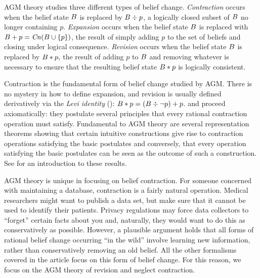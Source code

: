 AGM theory studies three different types of belief change. {\em Contraction}
occurs when the belief state $B$ is replaced by $B \div p$, a logically
closed subset of $B$ no longer containing $p$. {\em Expansion} occurs when
the belief state $B$ is replaced with $B+p = \text{\textit{Cn}}(B \cup \{p\})$, the
result of simply adding $p$ to the set of beliefs and closing under logical
consequence. {\em Revision} occurs when the belief state $B$ is replaced by
$B*p,$ the result of adding $p$ to $B$ and removing whatever is
necessary to ensure that the resulting belief state $B*p$ is logically
consistent.

Contraction is the fundamental form of belief change studied by AGM. There is no
mystery in how to define expansion, and revision is usually defined derivatively
via the {\em Levi identity} (): $B*p =
(B \div \neg p) + p$. \citet{alchourron1985logic} and \citet{
gardenfors1988revisions} proceed axiomatically: they postulate several
principles that every rational contraction operation must satisfy.  Fundamental
to AGM theory are several representation theorems showing that certain intuitive
constructions give rise to contraction operations satisfying the basic
postulates and conversely, that every operation satisfying the basic postulates
can be seen as the outcome of such a construction. See \citet{lin2019belief} for
an introduction to these results.  

AGM theory is unique in focusing on belief contraction. For someone concerned
with maintaining a database, contraction is a fairly natural operation. Medical
researchers might want to publish a data set, but make sure that it cannot be
used to identify their patients. Privacy regulations may force data collectors
to ``forget'' certain facts about you and, naturally, they would want to do this
as conservatively as possible.  However, a plausible argument holds that all
forms of rational belief change occurring ``in the wild'' involve learning new
information, rather than conservatively removing an old belief. All the other
formalisms covered in the article focus on this form of belief change. For this
reason, we focus on the AGM theory of revision and neglect contraction.

